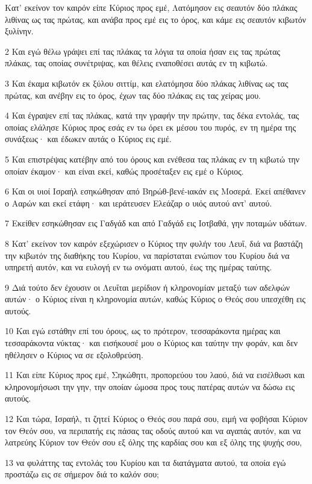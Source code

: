 \par Κατ' εκείνον τον καιρόν είπε Κύριος προς εμέ, Λατόμησον εις σεαυτόν δύο πλάκας λιθίνας ως τας πρώτας, και ανάβα προς εμέ εις το όρος, και κάμε εις σεαυτόν κιβωτόν ξυλίνην.
\par 2 Και εγώ θέλω γράψει επί τας πλάκας τα λόγια τα οποία ήσαν εις τας πρώτας πλάκας, τας οποίας συνέτριψας, και θέλεις εναποθέσει αυτάς εν τη κιβωτώ.
\par 3 Και έκαμα κιβωτόν εκ ξύλου σιττίμ, και ελατόμησα δύο πλάκας λιθίνας ως τας πρώτας, και ανέβην εις το όρος, έχων τας δύο πλάκας εις τας χείρας μου.
\par 4 Και έγραψεν επί τας πλάκας, κατά την γραφήν την πρώτην, τας δέκα εντολάς, τας οποίας ελάλησε Κύριος προς εσάς εν τω όρει εκ μέσου του πυρός, εν τη ημέρα της συνάξεως· και έδωκεν αυτάς ο Κύριος εις εμέ.
\par 5 Και επιστρέψας κατέβην από του όρους και ενέθεσα τας πλάκας εν τη κιβωτώ την οποίαν έκαμον· και είναι εκεί, καθώς προσέταξεν εις εμέ ο Κύριος.
\par 6 Και οι υιοί Ισραήλ εσηκώθησαν από Βηρώθ-βενέ-ιακάν εις Μοσερά. Εκεί απέθανεν ο Ααρών και εκεί ετάφη· και ιεράτευσεν Ελεάζαρ ο υιός αυτού αντ' αυτού.
\par 7 Εκείθεν εσηκώθησαν εις Γαδγάδ και από Γαδγάδ εις Ιοτβαθά, γην ποταμών υδάτων.
\par 8 Κατ' εκείνον τον καιρόν εξεχώρισεν ο Κύριος την φυλήν του Λευΐ, διά να βαστάζη την κιβωτόν της διαθήκης του Κυρίου, να παρίσταται ενώπιον του Κυρίου διά να υπηρετή αυτόν, και να ευλογή εν τω ονόματι αυτού, έως της ημέρας ταύτης.
\par 9 Διά τούτο δεν έχουσιν οι Λευΐται μερίδιον ή κληρονομίαν μεταξύ των αδελφών αυτών· ο Κύριος είναι η κληρονομία αυτών, καθώς Κύριος ο Θεός σου υπεσχέθη εις αυτούς.
\par 10 Και εγώ εστάθην επί του όρους, ως το πρότερον, τεσσαράκοντα ημέρας και τεσσαράκοντα νύκτας· και εισήκουσέ μου ο Κύριος και ταύτην την φοράν, και δεν ηθέλησεν ο Κύριος να σε εξολοθρεύση.
\par 11 Και είπε Κύριος προς εμέ, Σηκώθητι, προπορεύου του λαού, διά να εισέλθωσι και κληρονομήσωσι την γην, την οποίαν ώμοσα προς τους πατέρας αυτών να δώσω εις αυτούς.
\par 12 Και τώρα, Ισραήλ, τι ζητεί Κύριος ο Θεός σου παρά σου, ειμή να φοβήσαι Κύριον τον Θεόν σου, να περιπατής εις πάσας τας οδούς αυτού και να αγαπάς αυτόν, και να λατρεύης Κύριον τον Θεόν σου εξ όλης της καρδίας σου και εξ όλης της ψυχής σου,
\par 13 να φυλάττης τας εντολάς του Κυρίου και τα διατάγματα αυτού, τα οποία εγώ προστάζω εις σε σήμερον διά το καλόν σου;
